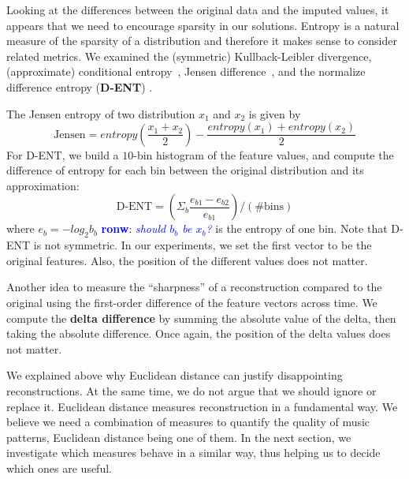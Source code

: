 \documentclass{article}
\newcommand{\FIXME}[2][FIXME]{\textcolor{blue}{\textbf{#1}: \emph{#2}}}
\begin{document}
Looking at the differences between the original data and the imputed
values, it appears that we need to encourage sparsity in our
solutions.  Entropy is a natural measure of the sparsity of a
distribution and therefore it makes sense to consider related metrics.
We examined the (symmetric) Kullback-Leibler divergence, (approximate)
conditional entropy~\cite{Peng2005}, Jensen difference~\cite{Michel1994}, and
the normalize difference entropy (\textbf{D-ENT})
\cite{Mentzelopoulos2004}.

The Jensen entropy of two distribution $x_1$ and $x_2$ is given by
\[
\mbox{Jensen} = entropy(\frac{x_1+x_2}{2}) - \frac{entropy(x_1) + entropy(x_2)}{2}
\]
For D-ENT, we build a $10$-bin histogram of the feature values,
and compute the difference of entropy for each bin between the original
distribution and its approximation:
\[
\mbox{D-ENT} = \left( \Sigma_b \frac{e_{b1} - e_{b2}}{e_{b1}} \right) / (\mbox{\# bins})
\]
where $e_b = - log_2 b_b$ \FIXME[ronw]{should $b_b$ be $x_b$?} is the
entropy of one bin.  Note that D-ENT is not symmetric. In our
experiments, we set the first vector to be the original
features. Also, the position of the different values does not matter.

Another idea to measure the ``sharpness'' of a reconstruction compared
to the original using the first-order difference of the feature
vectors across time. We compute the \textbf{delta difference} by summing
the absolute value of the delta, then taking the absolute
difference. Once again, the position of the delta values does not
matter.

We explained above why Euclidean distance can justify disappointing
reconstructions. At the same time, we do not argue that we should
ignore or replace it. Euclidean distance measures reconstruction in a
fundamental way. We believe we need a combination of measures to
quantify the quality of music patterns, Euclidean distance being one
of them. In the next section, we investigate which measures behave in
a similar way, thus helping us to decide which ones are useful.
\end{document}
